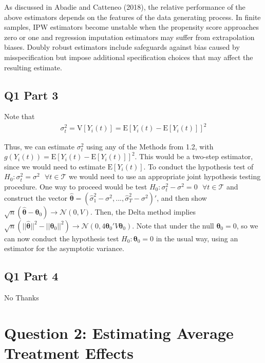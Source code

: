 \documentclass[11pt]{article}
\newcommand{\E}{\mathrm{E}}
\newcommand{\V}{\mathrm{V}}
\newcommand{\N}{\mathcal{N}}
\begin{document}
As discussed in Abadie and Catteneo (2018), the relative performance of the above estimators depends on the features of the data generating process. In finite samples, IPW estimators become unstable when the propensity score approaches zero or one and regression imputation estimators may suffer from extrapolation biases. Doubly robust estimators include safeguards against bias caused by misspecification but impose additional specification choices that may affect the resulting estimate.

\subsection{Q1 Part 3}

Note that 
\begin{align*}
\sigma_t^2 = \V[Y_i(t)] = \E\left[Y_i(t) - \E[Y_i(t)]\right]^2
\end{align*}

Thus, we can estimate $\sigma_t^2$ using any of the Methods from 1.2, with $g(Y_i(t)) = \E\left[Y_i(t) - \E[Y_i(t)]\right]^2$. This would be a two-step estimator, since we would need to estimate $\E[Y_i(t)]$. To conduct the hypothesis test of $H_0: \sigma_t^2 = \sigma^2 \text{ } \forall t \in \mathcal{T}$ we would need to use an appropriate joint hypothesis testing procedure. One way to proceed would be test  $H_0: \sigma_t^2 - \sigma^2 =0 \text{ } \forall t \in \mathcal{T}$  and construct the vector $\widehat{\bm{\theta}}= (\hat \sigma^2_1-\sigma^2,...,\hat\sigma^2_T-\sigma^2)'$, and then show $\sqrt{n}(\widehat{\bm{\theta}}-\bm{\theta}_0) \to \N(0,V)$. Then, the Delta method implies $\sqrt{n}(||\widehat{\bm{\theta}}||^2-||\bm{\theta}_0||^2) \to \N(0,4\bm{\theta}_0'V\bm{\theta}_0)$. Note that under the null $\bm{\theta}_0=0$, so we can now conduct the hypothesis test $H_0: \bm{\theta}_0=0$ in the usual way, using an estimator for the asymptotic variance.


\subsection{Q1 Part 4}
No Thanks 



\section{Question 2: Estimating Average Treatment Effects}
\end{document}
